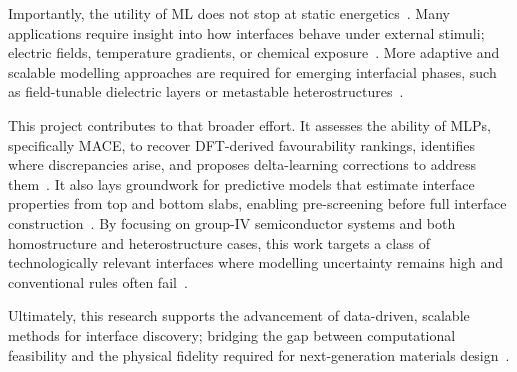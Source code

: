 \newpage \label{ml_interface_dynamics} Importantly, the utility of ML does not stop at static energetics~\nocite{}.
Many applications require insight into how interfaces behave under external stimuli; electric fields, temperature gradients, or chemical exposure~\cite{Chagarov2015-ol, Butler2019-ws, Leung2020-tv, Khot2025-hh}.
More adaptive and scalable modelling approaches are required for emerging interfacial phases, such as field-tunable dielectric layers or metastable heterostructures~\nocite{}.

\label{project_contributions} This project contributes to that broader effort.
It assesses the ability of MLPs, specifically MACE, to recover DFT-derived favourability rankings, identifies where discrepancies arise, and proposes delta-learning corrections to address them~\nocite{}.
It also lays groundwork for predictive models that estimate interface properties from top and bottom slabs, enabling pre-screening before full interface construction~\nocite{}.
By focusing on group-IV semiconductor systems and both homostructure and heterostructure cases, this work targets a class of technologically relevant interfaces where modelling uncertainty remains high and conventional rules often fail~\nocite{}.

\label{advancing_interface_discovery} Ultimately, this research supports the advancement of data-driven, scalable methods for interface discovery; bridging the gap between computational feasibility and the physical fidelity required for next-generation materials design~\nocite{}.
